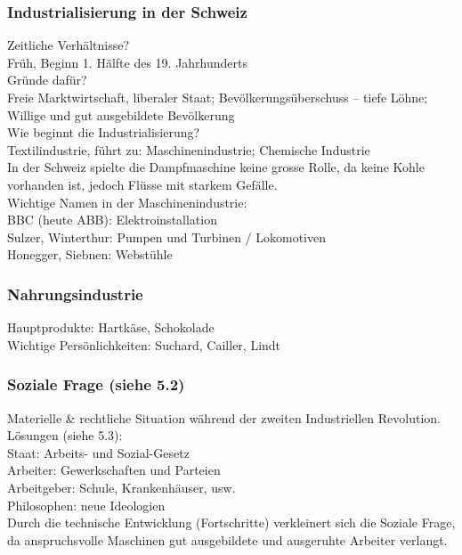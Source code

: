 \documentclass[10pt, openright=true]{scrartcl}
\begin{document}
\subsubsection{Industrialisierung in der Schweiz}
Zeitliche Verhältnisse?\\
Früh, Beginn 1. Hälfte des 19. Jahrhunderts\\
Gründe dafür?\\
Freie Marktwirtschaft, liberaler Staat; Bevölkerungsüberschuss – tiefe Löhne; Willige und gut ausgebildete Bevölkerung\\
Wie beginnt die Industrialisierung?\\
Textilindustrie, führt zu: Maschinenindustrie; Chemische Industrie\\
In der Schweiz spielte die Dampfmaschine keine grosse Rolle, da keine Kohle vorhanden ist, jedoch Flüsse mit starkem Gefälle. \\
Wichtige Namen in der Maschinenindustrie:\\
BBC (heute ABB): Elektroinstallation\\
Sulzer, Winterthur: Pumpen und Turbinen / Lokomotiven\\
Honegger, Siebnen: Webstühle \vspace{-0.5cm}
\subsubsection{Nahrungsindustrie}
Hauptprodukte: Hartkäse, Schokolade\\
Wichtige Persönlichkeiten: Suchard, Cailler, Lindt \vspace{-0.5cm}
\subsubsection{Soziale Frage (siehe 5.2)}
Materielle \& rechtliche Situation während der zweiten Industriellen Revolution.\\
Lösungen (siehe 5.3):\\
Staat: Arbeits- und Sozial-Gesetz\\
Arbeiter: Gewerkschaften und Parteien\\
Arbeitgeber: Schule, Krankenhäuser, usw.\\
Philosophen: neue Ideologien\\
Durch die technische Entwicklung (Fortschritte) verkleinert sich die Soziale Frage, da anspruchsvolle Maschinen gut ausgebildete und ausgeruhte Arbeiter verlangt.
\end{document}
